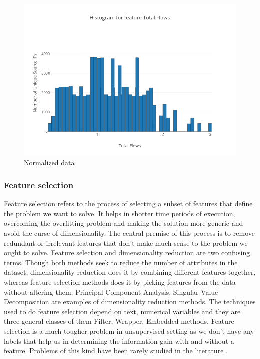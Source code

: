 \begin{figure}[b]
	\centerline{\includegraphics[scale = 1.0]{transformed.png}}
	\caption{Normalized data}%
\end{figure}

\subsubsection{Feature selection}		
	
	Feature selection refers to the process of selecting a subset of features that define the problem we want to solve. It helps in shorter time periods of execution, overcoming the overfitting problem and making the solution more generic and avoid the curse of dimensionality. The central premise of this process is to remove redundant or irrelevant features that don't make much sense to the problem we ought to solve. Feature selection and dimensionality reduction are two confusing terms. Though both methods seek to reduce the number of attributes in the dataset, dimensionality reduction does it by combining different features together, whereas feature selection methods does it by picking features from the data without altering them. Principal Component Analysis, Singular Value Decomposition are examples of dimensionality reduction methods. The techniques used to do feature selection depend on text, numerical variables and they are three general classes of them Filter, Wrapper, Embedded methods.	Feature selection is a much tougher problem in unsupervised setting as we don't have any labels that help us in determining the information gain with and without a feature. Problems of
	this kind have been rarely studied in the literature \cite{boutsidis2009unsupervised} \cite{dash2002feature}. 
	
